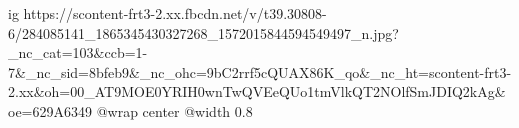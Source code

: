  
 
 
 
 

\ifcmt
  ig https://scontent-frt3-2.xx.fbcdn.net/v/t39.30808-6/284085141_1865345430327268_1572015844594549497_n.jpg?_nc_cat=103&ccb=1-7&_nc_sid=8bfeb9&_nc_ohc=9bC2rrf5cQUAX86K_qo&_nc_ht=scontent-frt3-2.xx&oh=00_AT9MOE0YRIH0wnTwQVEeQUo1tmVlkQT2NOlfSmJDIQ2kAg&oe=629A6349
  @wrap center
  @width 0.8
\fi
